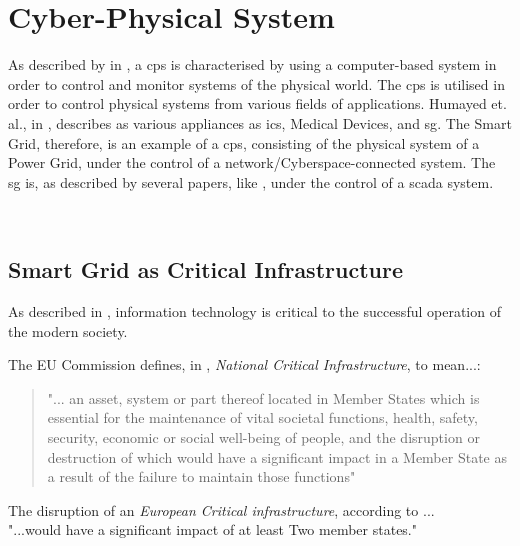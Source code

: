 \section{Cyber-Physical System}

As described by \citeauthor{humayed2017cyber} in \cite{humayed2017cyber}, a \acrfull{cps} is characterised by using a computer-based system in order to control and monitor systems of the physical world. The \acrshort{cps} is utilised in order to control physical systems from various fields of applications. Humayed et. al., in \cite{humayed2017cyber}, describes as various appliances as \acrfull{ics}, Medical Devices, and \acrlong{sg}.
The Smart Grid, therefore, is an example of a \acrfull{cps}, consisting of the physical system of a Power Grid, under the control of a network/Cyberspace-connected system. 
The \acrshort{sg} is, as described by several papers, like \cite{humayed2017cyber}%
, under the control of a \acrfull{scada} system.




\










\subsection{Smart Grid as Critical Infrastructure}



As described in \cite{colesniuc2013cyberspace}, information technology is critical to the successful operation of the modern society.




 
 The EU Commission defines, in \cite{eu2008council}, \textit{National Critical Infrastructure}, to mean...:
 
 \begin{quote}
    "... an asset, system or part thereof
located in Member States which is essential for the maintenance of vital societal functions, health, safety, security,
economic or social well-being of people, and the disruption
or destruction of which would have a significant impact in a
Member State as a result of the failure to maintain those
functions"   \cite[p.  L 345/77]{eu2008council}  
 \end{quote}
 
 The disruption of an \textit{European Critical infrastructure}, according to  \cite{eu2008council}... \\ "...would have a significant impact of at least Two member states."

